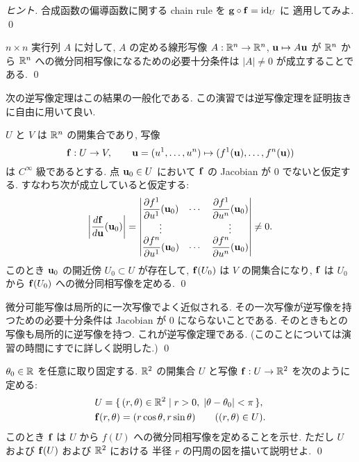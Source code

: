 \documentclass[12pt,twoside]{jarticle}
\begin{document}
\begin{proof}[ヒント]
 合成函数の偏導函数に関する chain rule を ${\mathbf g}\circ{\mathbf f}=\mathop{\mathrm{id}}\nolimits_U$ に
 適用してみよ. \qed
\end{proof}

\begin{question}[線形写像の逆写像定理]
 $n\times n$ 実行列 $A$ に対して, 
 $A$ の定める線形写像 $A:{\mathbb R}^n\to{\mathbb R}^n$, ${\mathbf u}\mapsto A{\mathbf u}$ 
 が ${\mathbb R}^n$ から ${\mathbb R}^n$ への微分同相写像になるための必要十分条件は %
 $|A|\ne 0$ が成立することである. 
 \qed
\end{question}

次の逆写像定理はこの結果の一般化である. 
この演習では逆写像定理を証明抜きに自由に用いて良い.

\begin{theorem}
 $U$ と $V$ は ${\mathbb R}^n$ の開集合であり, 写像
 \begin{equation*}
  {\mathbf f}:U\to V, \qquad
  {\mathbf u}=(u^1,\ldots,u^n)\mapsto (f^1({\mathbf u}),\ldots,f^n({\mathbf u}))
 \end{equation*}
 は $C^\infty$ 級であるとする.
 点 ${\mathbf u}_0\in U$ において ${\mathbf f}$ の Jacobian が $0$ でないと仮定する.
 すなわち次が成立していると仮定する:
 \begin{equation*}
  \left|\dfrac{d{\mathbf f}}{d{\mathbf u}}({\mathbf u}_0)\right|
  =
  \begin{vmatrix}
   \dfrac{\partial f^1}{\partial u^1}({\mathbf u}_0) & \cdots & \dfrac{\partial f^1}{\partial u^n}({\mathbf u}_0) \\
   \vdots                       &        & \vdots \\
   \dfrac{\partial f^n}{\partial u^1}({\mathbf u}_0) & \cdots & \dfrac{\partial f^n}{\partial u^n}({\mathbf u}_0) \\
  \end{vmatrix}
  \ne 0.
 \end{equation*} 
 このとき ${\mathbf u}_0$ の開近傍 $U_0\subset U$ が存在して, %
 ${\mathbf f}(U_0)$ は $V$ の開集合になり, %
 ${\mathbf f}$ は $U_0$ から ${\mathbf f}(U_0)$ への微分同相写像を定める.
 \qed
\end{theorem}

\begin{guide}[逆写像定理の直観的説明]
 微分可能写像は局所的に一次写像でよく近似される. 
 その一次写像が逆写像を持つための必要十分条件は 
 Jacobian が $0$ にならないことである.
 そのときもとの写像も局所的に逆写像を持つ.
 これが逆写像定理である.
 (このことについては演習の時間にすでに詳しく説明した.)
 \qed
\end{guide}

\begin{question}[2次元極座標]
 $\theta_0\in{\mathbb R}$ を任意に取り固定する.
 ${\mathbb R}^2$ の開集合 $U$ と写像 ${\mathbf f}:U\to{\mathbb R}^2$ を次のように定める:
 \begin{align*}
  &
  U = \{\,(r,\theta)\in{\mathbb R}^2\mid r > 0,\; |\theta-\theta_0|<\pi\,\},
  \\ &
  {\mathbf f}(r,\theta) = (r\cos\theta, r\sin\theta)
  \qquad ((r,\theta)\in U).
 \end{align*}
 このとき ${\mathbf f}$ は $U$ から $f(U)$ への微分同相写像を定めることを示せ.
 ただし $U$ および ${\mathbf f}(U)$ および ${\mathbb R}^2$ における
 半径 $r$ の円周の図を描いて説明せよ.
 \qed
\end{question}
\end{document}
